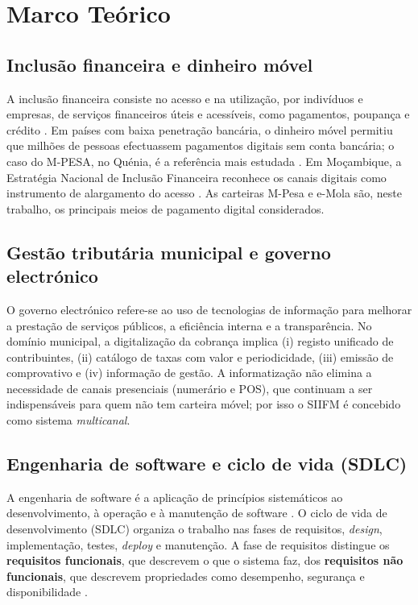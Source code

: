 \documentclass[12pt,a4paper,openany]{report}
\begin{document}
\chapter{Marco Teórico}

\section{Inclusão financeira e dinheiro móvel}
A inclusão financeira consiste no acesso e na utilização, por indivíduos e empresas, de serviços financeiros úteis e acessíveis, como pagamentos, poupança e crédito \cite{findex2021}. Em países com baixa penetração bancária, o dinheiro móvel permitiu que milhões de pessoas efectuassem pagamentos digitais sem conta bancária; o caso do M-PESA, no Quénia, é a referência mais estudada \cite{jack2011}. Em Moçambique, a Estratégia Nacional de Inclusão Financeira reconhece os canais digitais como instrumento de alargamento do acesso \cite{enif}. As carteiras M-Pesa e e-Mola são, neste trabalho, os principais meios de pagamento digital considerados.

\section{Gestão tributária municipal e governo electrónico}
O governo electrónico refere-se ao uso de tecnologias de informação para melhorar a prestação de serviços públicos, a eficiência interna e a transparência. No domínio municipal, a digitalização da cobrança implica (i) registo unificado de contribuintes, (ii) catálogo de taxas com valor e periodicidade, (iii) emissão de comprovativo e (iv) informação de gestão. A informatização não elimina a necessidade de canais presenciais (numerário e POS), que continuam a ser indispensáveis para quem não tem carteira móvel; por isso o SIIFM é concebido como sistema \emph{multicanal}.

\section{Engenharia de software e ciclo de vida (SDLC)}
A engenharia de software é a aplicação de princípios sistemáticos ao desenvolvimento, à operação e à manutenção de software \cite{sommerville2016,pressman2020}. O ciclo de vida de desenvolvimento (SDLC) organiza o trabalho nas fases de requisitos, \emph{design}, implementação, testes, \emph{deploy} e manutenção. A fase de requisitos distingue os \textbf{requisitos funcionais}, que descrevem o que o sistema faz, dos \textbf{requisitos não funcionais}, que descrevem propriedades como desempenho, segurança e disponibilidade \cite{sommerville2016}.
\end{document}
